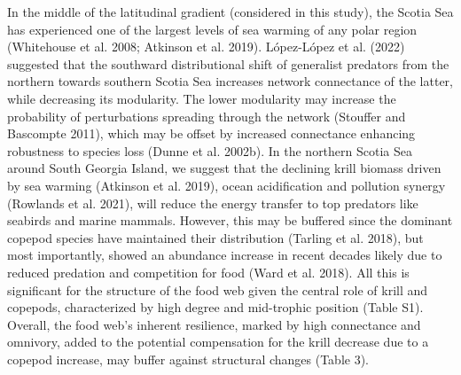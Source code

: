 \documentclass[
]{article}
\begin{document}
In the middle of the latitudinal gradient (considered in this study),
the Scotia Sea has experienced one of the largest levels of sea warming
of any polar region (Whitehouse et al. 2008; Atkinson et al. 2019).
López-López et al. (2022) suggested that the southward distributional
shift of generalist predators from the northern towards southern Scotia
Sea increases network connectance of the latter, while decreasing its
modularity. The lower modularity may increase the probability of
perturbations spreading through the network (Stouffer and Bascompte
2011), which may be offset by increased connectance enhancing robustness
to species loss (Dunne et al. 2002b). In the northern Scotia Sea around
South Georgia Island, we suggest that the declining krill biomass driven
by sea warming (Atkinson et al. 2019), ocean acidification and pollution
synergy (Rowlands et al. 2021), will reduce the energy transfer to top
predators like seabirds and marine mammals. However, this may be
buffered since the dominant copepod species have maintained their
distribution (Tarling et al. 2018), but most importantly, showed an
abundance increase in recent decades likely due to reduced predation and
competition for food (Ward et al. 2018). All this is significant for the
structure of the food web given the central role of krill and copepods,
characterized by high degree and mid-trophic position (Table S1).
Overall, the food web's inherent resilience, marked by high connectance
and omnivory, added to the potential compensation for the krill decrease
due to a copepod increase, may buffer against structural changes (Table
3).
\end{document}
